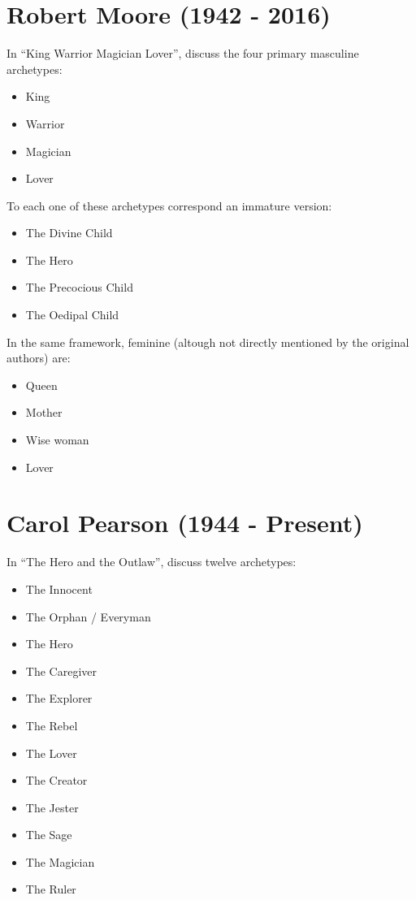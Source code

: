 \documentclass[
]{book}
\providecommand{\tightlist}{%
  \setlength{\itemsep}{0pt}\setlength{\parskip}{0pt}}
\begin{document}
\hypertarget{robert-moore-1942---2016}{%
\section{Robert Moore (1942 - 2016)}\label{robert-moore-1942---2016}}

In ``King Warrior Magician Lover'', \citet{moore1991king} discuss the four primary masculine archetypes:

\begin{itemize}
\tightlist
\item
  King
\item
  Warrior
\item
  Magician
\item
  Lover
\end{itemize}

To each one of these archetypes correspond an immature version:

\begin{itemize}
\tightlist
\item
  The Divine Child
\item
  The Hero
\item
  The Precocious Child
\item
  The Oedipal Child
\end{itemize}

In the same framework, feminine (altough not directly mentioned by the original authors) are:

\begin{itemize}
\tightlist
\item
  Queen
\item
  Mother
\item
  Wise woman
\item
  Lover
\end{itemize}

\hypertarget{carol-pearson-1944---present}{%
\section{Carol Pearson (1944 - Present)}\label{carol-pearson-1944---present}}

In ``The Hero and the Outlaw'', \citet{mark2001hero} discuss twelve archetypes:

\begin{itemize}
\tightlist
\item
  The Innocent
\item
  The Orphan / Everyman
\item
  The Hero
\item
  The Caregiver
\item
  The Explorer
\item
  The Rebel
\item
  The Lover
\item
  The Creator
\item
  The Jester
\item
  The Sage
\item
  The Magician
\item
  The Ruler
\end{itemize}
\end{document}
